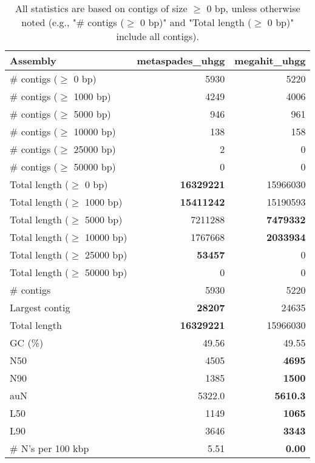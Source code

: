 \documentclass[12pt,a4paper]{article}
\begin{document}
\begin{table}[ht]
\begin{center}
\caption{All statistics are based on contigs of size $\geq$ 0 bp, unless otherwise noted (e.g., "\# contigs ($\geq$ 0 bp)" and "Total length ($\geq$ 0 bp)" include all contigs).}
\begin{tabular}{|l*{2}{|r}|}
\hline
Assembly & metaspades\_uhgg & megahit\_uhgg \\ \hline
\# contigs ($\geq$ 0 bp) & 5930 & 5220 \\ \hline
\# contigs ($\geq$ 1000 bp) & 4249 & 4006 \\ \hline
\# contigs ($\geq$ 5000 bp) & 946 & 961 \\ \hline
\# contigs ($\geq$ 10000 bp) & 138 & 158 \\ \hline
\# contigs ($\geq$ 25000 bp) & 2 & 0 \\ \hline
\# contigs ($\geq$ 50000 bp) & 0 & 0 \\ \hline
Total length ($\geq$ 0 bp) & {\bf 16329221} & 15966030 \\ \hline
Total length ($\geq$ 1000 bp) & {\bf 15411242} & 15190593 \\ \hline
Total length ($\geq$ 5000 bp) & 7211288 & {\bf 7479332} \\ \hline
Total length ($\geq$ 10000 bp) & 1767668 & {\bf 2033934} \\ \hline
Total length ($\geq$ 25000 bp) & {\bf 53457} & 0 \\ \hline
Total length ($\geq$ 50000 bp) & 0 & 0 \\ \hline
\# contigs & 5930 & 5220 \\ \hline
Largest contig & {\bf 28207} & 24635 \\ \hline
Total length & {\bf 16329221} & 15966030 \\ \hline
GC (\%) & 49.56 & 49.55 \\ \hline
N50 & 4505 & {\bf 4695} \\ \hline
N90 & 1385 & {\bf 1500} \\ \hline
auN & 5322.0 & {\bf 5610.3} \\ \hline
L50 & 1149 & {\bf 1065} \\ \hline
L90 & 3646 & {\bf 3343} \\ \hline
\# N's per 100 kbp & 5.51 & {\bf 0.00} \\ \hline
\end{tabular}
\end{center}
\end{table}
\end{document}
